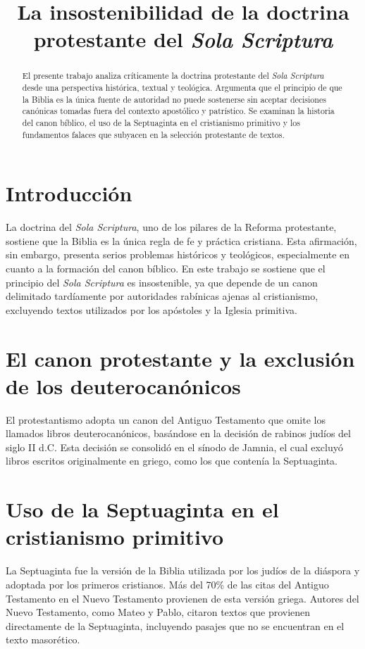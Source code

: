 \documentclass[12pt]{article}
\title{La insostenibilidad de la doctrina protestante del \textit{Sola Scriptura}}
\author{}
\date{}
\begin{document}
\maketitle

\begin{abstract}
El presente trabajo analiza críticamente la doctrina protestante del \textit{Sola Scriptura} desde una perspectiva histórica, textual y teológica. Argumenta que el principio de que la Biblia es la única fuente de autoridad no puede sostenerse sin aceptar decisiones canónicas tomadas fuera del contexto apostólico y patrístico. Se examinan la historia del canon bíblico, el uso de la Septuaginta en el cristianismo primitivo y los fundamentos falaces que subyacen en la selección protestante de textos.
\end{abstract}

\section{Introducción}

La doctrina del \textit{Sola Scriptura}, uno de los pilares de la Reforma protestante, sostiene que la Biblia es la única regla de fe y práctica cristiana. Esta afirmación, sin embargo, presenta serios problemas históricos y teológicos, especialmente en cuanto a la formación del canon bíblico. En este trabajo se sostiene que el principio del \textit{Sola Scriptura} es insostenible, ya que depende de un canon delimitado tardíamente por autoridades rabínicas ajenas al cristianismo, excluyendo textos utilizados por los apóstoles y la Iglesia primitiva.

\section{El canon protestante y la exclusión de los deuterocanónicos}

El protestantismo adopta un canon del Antiguo Testamento que omite los llamados libros deuterocanónicos, basándose en la decisión de rabinos judíos del siglo II d.C. Esta decisión se consolidó en el sínodo de Jamnia, el cual excluyó libros escritos originalmente en griego, como los que contenía la Septuaginta.

\section{Uso de la Septuaginta en el cristianismo primitivo}

La Septuaginta fue la versión de la Biblia utilizada por los judíos de la diáspora y adoptada por los primeros cristianos. Más del 70\% de las citas del Antiguo Testamento en el Nuevo Testamento provienen de esta versión griega. Autores del Nuevo Testamento, como Mateo y Pablo, citaron textos que provienen directamente de la Septuaginta, incluyendo pasajes que no se encuentran en el texto masorético.
\end{document}
